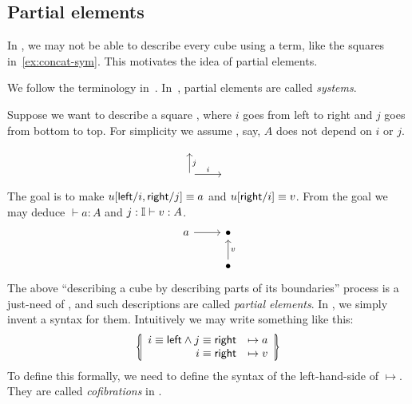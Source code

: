 \subsection{Partial elements}\label{sub:partial}
In \CTT, we may not be able to describe every cube using a term,
like the squares in~\cref{ex:concat-sym}.
This motivates the idea of partial elements.
\begin{terminology}
We follow the terminology in~\cite{CubicalAgda}.
In~\cite{CCHM}, partial elements are called \textit{systems}.
\end{terminology}
Suppose we want to describe a square ,
where $i$ goes from left to right and $j$ goes from bottom to top.
For simplicity we assume , say, $A$ does not depend on $i$ or $j$.
\[\begin{tikzcd}
	{} \\
	{} & {}
	\arrow["i", from=2-1, to=2-2]
	\arrow["j"', from=2-1, to=1-1]
\end{tikzcd}\]
The goal is to make $u[\textsf{left}/i, \textsf{right}/j]\equiv a$ and $u[\textsf{right}/i]\equiv v$.
From the goal we may deduce $\vdash a:A$ and $j:\mathbb{I}\vdash v:A$.
\[\begin{tikzcd}
	a & \bullet \\
	& \bullet
	\arrow[from=1-1, to=1-2]
	\arrow["v"', from=2-2, to=1-2]
\end{tikzcd}\]
The above ``describing a cube by describing parts of its boundaries''
process is a just-need of \CTT, and such descriptions are called \textit{partial elements}.
In \CTT, we simply invent a syntax for them.
Intuitively we may write something like this:
\[\lrbbar{\begin{array}{rc}
  i\equiv\lcon \land j\equiv\rcon&\mapsto a\\
  i\equiv\rcon &\mapsto v
\end{array}}\]
To define this formally, we need to define the syntax of the left-hand-side of $\mapsto$.
They are called \textit{cofibrations} in \CTT.
